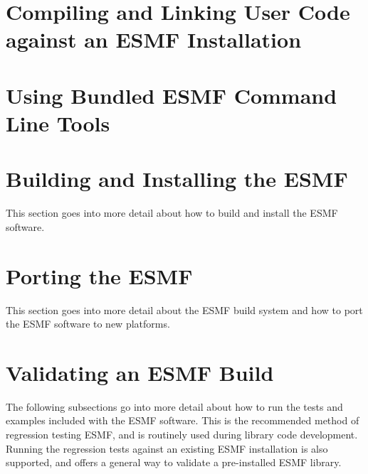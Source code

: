
\section{Compiling and Linking User Code against an ESMF Installation}
\label{sec:Use}


\newpage

\section{Using Bundled ESMF Command Line Tools}
\label{sec:CLTs}


\newpage

\section{Building and Installing the ESMF}
\label{sec:TechOver}

This section goes into more detail about how to build and install the ESMF
software.




\section{Porting the ESMF}
\label{sec:TechOverPort}

This section goes into more detail about the ESMF build system and how to
port the ESMF software to new platforms.




\section{Validating an ESMF Build}
\label{sec:TechOver2}

The following subsections go into more detail about how to run the tests and
examples included with the ESMF software. This is the recommended method of
regression testing ESMF, and is routinely used during library code development.
Running the regression tests against an existing ESMF installation is also 
supported, and offers a general way to validate a pre-installed ESMF library.





